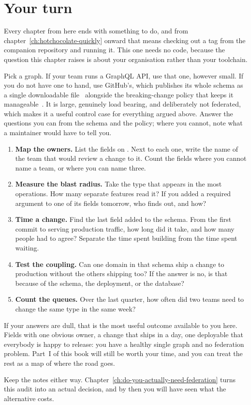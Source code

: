 \section*{Your turn}

Every chapter from here ends with something to do, and from
chapter~\ref{ch:hotchocolate-quickly} onward that means checking out a tag from
the companion repository and running it. This one needs no code, because the
question this chapter raises is about your organisation rather than your
toolchain.

Pick a graph. If your team runs a GraphQL API, use that one, however small. If
you do not have one to hand, use GitHub's, which publishes its whole schema as a
single downloadable file~\autocite{github2026schema} alongside the
breaking-change policy that keeps it
manageable~\autocite{github2026breaking}. It is large, genuinely load bearing,
and deliberately not federated, which makes it a useful control case for
everything argued above. Answer the questions you can from the schema and the
policy; where you cannot, note what a maintainer would have to tell you.

\begin{enumerate}
  \item \textbf{Map the owners.} List the fields on . Next to each
  one, write the name of the team that would review a change to it. Count the
  fields where you cannot name a team, or where you can name three.

  \item \textbf{Measure the blast radius.} Take the type that appears in the
  most operations. How many separate features read it? If you added a required
  argument to one of its fields tomorrow, who finds out, and how?

  \item \textbf{Time a change.} Find the last field added to the schema. From
  the first commit to serving production traffic, how long did it take, and how
  many people had to agree? Separate the time spent building from the time
  spent waiting.

  \item \textbf{Test the coupling.} Can one domain in that schema ship a change
  to production without the others shipping too? If the answer is no, is that
  because of the schema, the deployment, or the database?

  \item \textbf{Count the queues.} Over the last quarter, how often did two
  teams need to change the same type in the same week?
\end{enumerate}

If your answers are dull, that is the most useful outcome available to you
here. Fields with one obvious owner, a change that ships in a day, one
deployable that everybody is happy to release: you have a healthy single graph
and no federation problem. Part~I of this book will still be worth your time,
and you can treat the rest as a map of where the road goes.

Keep the notes either way. Chapter~\ref{ch:do-you-actually-need-federation}
turns this audit into an actual decision, and by then you will have seen what
the alternative costs.
